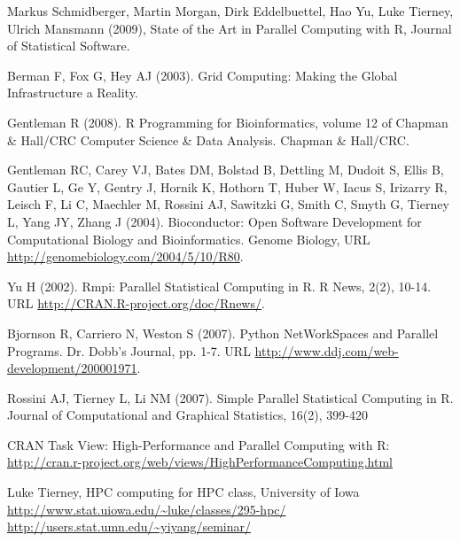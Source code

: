 \documentclass[12pt]{article}
\begin{document}



\begin{thebibliography}{}

\bibitem{}
Markus Schmidberger, Martin Morgan, Dirk Eddelbuettel, Hao Yu, Luke Tierney, Ulrich Mansmann (2009),  State of the Art in Parallel Computing with R, Journal of Statistical Software.

\bibitem{}
Berman F, Fox G, Hey AJ (2003). Grid Computing: Making the Global Infrastructure a Reality.

\bibitem{}
Gentleman R (2008). R Programming for Bioinformatics, volume 12 of Chapman \& Hall/CRC
Computer Science \& Data Analysis. Chapman \& Hall/CRC.

\bibitem{}
Gentleman RC, Carey VJ, Bates DM, Bolstad B, Dettling M, Dudoit S, Ellis B, Gautier
L, Ge Y, Gentry J, Hornik K, Hothorn T, Huber W, Iacus S, Irizarry R, Leisch F, Li
C, Maechler M, Rossini AJ, Sawitzki G, Smith C, Smyth G, Tierney L, Yang JY, Zhang
J (2004). Bioconductor: Open Software Development for Computational Biology and
Bioinformatics. Genome Biology,  URL \url{http://genomebiology.com/2004/5/10/R80}.

\bibitem{}
Yu H (2002). Rmpi: Parallel Statistical Computing in R. R News, 2(2), 10-14. URL
\url{http://CRAN.R-project.org/doc/Rnews/}.

\bibitem{}
Bjornson R, Carriero N, Weston S (2007). Python NetWorkSpaces and Parallel Programs.
Dr. Dobb's Journal, pp. 1-7. URL \url{http://www.ddj.com/web-development/200001971}.

\bibitem{}
Rossini AJ, Tierney L, Li NM (2007). Simple Parallel Statistical Computing in R. Journal
of Computational and Graphical Statistics, 16(2), 399-420

\bibitem{}
CRAN Task View: High-Performance and Parallel Computing with R:
\url{http://cran.r-project.org/web/views/HighPerformanceComputing.html}

\bibitem{} 
Luke Tierney, HPC computing for HPC class, University of Iowa
\url{http://www.stat.uiowa.edu/~luke/classes/295-hpc/}
\url{http://users.stat.umn.edu/~yiyang/seminar/}

\end{thebibliography}

 
\end{document}
